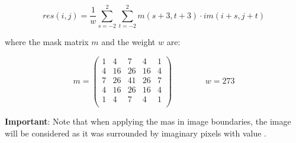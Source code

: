 \[
res(i,j) = \frac{1}{w} \sum_{s=-2}^2 \sum_{t=-2}^2 m(s+3,t+3) \cdot
im(i+s,j+t)
\]

where the mask matrix $m$ and the weight $w$ are:

\[
m =
\begin{pmatrix}
1 & 4 & 7 & 4 & 1\\ 
4 & 16 & 26 & 16 & 4\\
7 & 26 & 41 & 26 & 7\\
4 & 16 & 26 & 16 & 4\\
1 & 4 & 7 & 4 & 1\\
\end{pmatrix}
\qquad
\qquad
w = 273
\]

\textbf{Important}: 
Note that when applying the mas in image boundaries, the image will be
considered as it was surrounded by imaginary pixels with value
.

